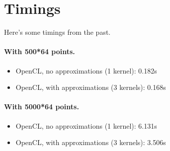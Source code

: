 \documentclass[letterpaper,10pt]{article}
\begin{document}
\section*{Timings}
Here's some timings from the past.

\paragraph{With 500*64 points.}
\begin{itemize}
\item    OpenCL, no approximations (1 kernel): 0.182s
\item    OpenCL, with approximations (3 kernels): 0.168s
\end{itemize}

\paragraph{With 5000*64 points.}
\begin{itemize}
\item    OpenCL, no approximations (1 kernel): 6.131s
\item    OpenCL, with approximations (3 kernels): 3.506s
\end{itemize}
\end{document}
